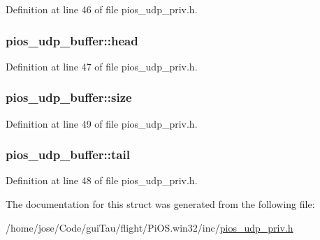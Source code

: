 Definition at line 46 of file pios\-\_\-udp\-\_\-priv.\-h.

\hypertarget{structpios__udp__buffer_af175b1e49aa32af8c38933a3c7e32d01}{
\subsubsection[{head}]{ pios\-\_\-udp\-\_\-buffer\-::head}}\label{structpios__udp__buffer_af175b1e49aa32af8c38933a3c7e32d01}


Definition at line 47 of file pios\-\_\-udp\-\_\-priv.\-h.

\hypertarget{structpios__udp__buffer_addcfd72bb66d1ca1dae652fc36cecd12}{
\subsubsection[{size}]{ pios\-\_\-udp\-\_\-buffer\-::size}}\label{structpios__udp__buffer_addcfd72bb66d1ca1dae652fc36cecd12}


Definition at line 49 of file pios\-\_\-udp\-\_\-priv.\-h.

\hypertarget{structpios__udp__buffer_aea5cd8277c4484fb41c81df68139c47d}{
\subsubsection[{tail}]{ pios\-\_\-udp\-\_\-buffer\-::tail}}\label{structpios__udp__buffer_aea5cd8277c4484fb41c81df68139c47d}


Definition at line 48 of file pios\-\_\-udp\-\_\-priv.\-h.



The documentation for this struct was generated from the following file\-:\begin{DoxyCompactItemize}
\item 
/home/jose/\-Code/gui\-Tau/flight/\-Pi\-O\-S.\-win32/inc/\hyperlink{_pi_o_s_8win32_2inc_2pios__udp__priv_8h}{pios\-\_\-udp\-\_\-priv.\-h}\end{DoxyCompactItemize}
